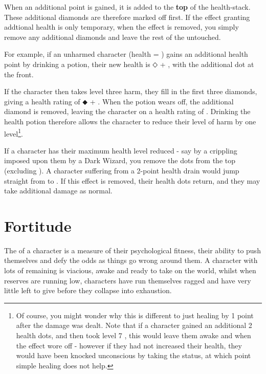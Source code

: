 When an additional  point is gained, it is added to the {\bf top} of the health-stack. These additional diamonds are therefore marked off first. If the effect granting addtional health is only temporary, when the effect is removed, you simply remove any additional diamonds and leave the rest of the  untouched. 

For example, if an unharmed character (health = \emptyCape) gains an additional health point by drinking a potion, their new health is $\mdwhtdiamond$ + \emptyCape, with the additional dot at the front. 

If the character then takes level three harm, they fill in the first three diamonds, giving a health rating of $\mdblkdiamond$ + \twoCape. When the potion wears off, the additional diamond is removed, leaving the character on a health rating of \twoCape. Drinking the health potion therefore allows the character to reduce their level of harm by one level\footnote{Of course, you might wonder why this is different to just healing by 1 point after the damage was dealt. Note that if a character gained an additional 2 health dots, and then took level 7 , this would leave them awake and  when the effect wore off - however if they had not increased their health, they would have been knocked unconscious by taking the  status, at which point simple healing does not help.}.

If a character has their maximum health level reduced - say by a crippling  imposed upon them by a Dark Wizard, you remove the dots from the top (excluding ). A character suffering from a 2-point health drain would jump straight from  to . If this effect is removed, their health dots return, and they may take additional damage as normal.

\section{Fortitude}

The  of a character is a measure of their psychological fitness, their ability to push themselves and defy the odds as things go wrong around them. A character with lots of  remaining is viacious, awake and ready to take on the world, whilst when  reserves are running low, characters have run themselves ragged and have very little left to give before they collapse into exhaustion. 

